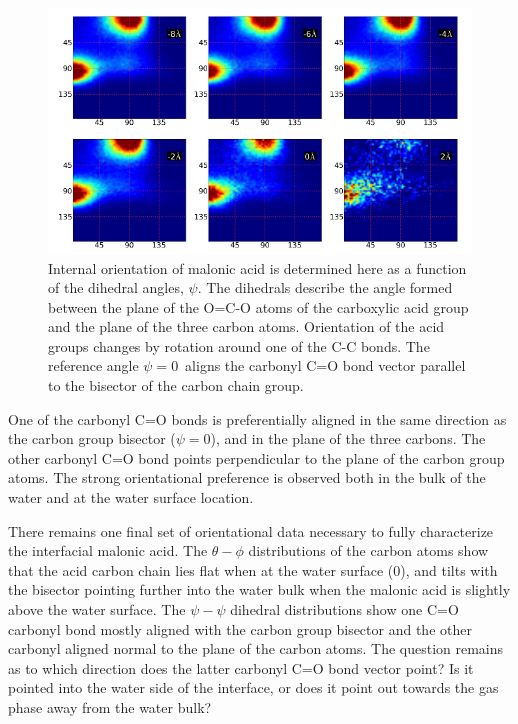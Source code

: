 \begin{figure}[h!]
	\begin{center}
		\includegraphics[scale=1.0]{images/malonic-angles/carboxylic-psi-psi.png}
		\caption{Internal orientation of malonic acid is determined here as a function of the dihedral angles, $\psi$. The dihedrals describe the angle formed between the plane of the O=C-O atoms of the carboxylic acid group  and the plane of the three carbon atoms. Orientation of the acid groups changes by rotation around one of the C-C bonds. The reference angle $\psi=0$\textdegree~aligns the carbonyl C=O bond vector parallel to the bisector of the carbon chain group.}
		\label{fig:carboxylic-psi-psi}
	\end{center}
\end{figure}

One of the carbonyl C=O bonds is preferentially aligned in the same direction as the carbon group bisector ($\psi=0$\textdegree), and in the plane of the three carbons. The other carbonyl C=O bond points perpendicular to the plane of the carbon group atoms. The strong orientational preference is observed both in the bulk of the water and at the water surface location.

There remains one final set of orientational data necessary to fully characterize the interfacial malonic acid. The $\theta-\phi$ distributions of the carbon atoms show that the acid carbon chain lies flat when at the water surface (0\angs), and tilts with the bisector pointing further into the water bulk when the malonic acid is slightly above the water surface. The $\psi-\psi$ dihedral distributions show one C=O carbonyl bond mostly aligned with the carbon group bisector and the other carbonyl aligned normal to the plane of the carbon atoms. The question remains as to which direction does the latter carbonyl C=O bond vector point? Is it pointed into the water side of the interface, or does it point out towards the gas phase away from the water bulk?

